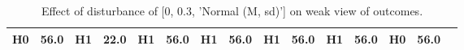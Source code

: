 \begin{table}
\begin{tabular}{l|cc|cc|cc|cc|cc|cc|cc}
\cellcolor{Bittersweet}H0&\cellcolor{Bittersweet}56.0&\cellcolor{Bittersweet}H1&\cellcolor{Bittersweet}22.0&\cellcolor{Bittersweet}H1&\cellcolor{Bittersweet}56.0&\cellcolor{Bittersweet}H1&\cellcolor{Bittersweet}56.0&\cellcolor{Bittersweet}H1&\cellcolor{Bittersweet}56.0&\cellcolor{Bittersweet}H1&\cellcolor{Bittersweet}56.0&\cellcolor{Bittersweet}H0&\cellcolor{Bittersweet}56.0\\\bottomrule\end{tabular}\caption{Effect of disturbance of [0, 0.3, 'Normal (M, sd)'] on weak view of outcomes.}\end{table}